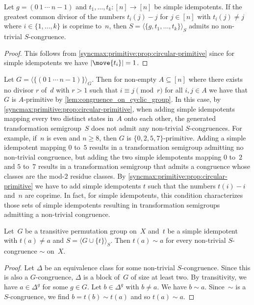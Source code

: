 \begin{corollary}
	Let $g = (0 ~ 1 ~ \cdots ~ n - 1)$
	and $t_1, \ldots, t_k \colon [n] \to [n]$
	be simple idempotents. If the greatest common divisor
	of the numbers $t_i(j) - j$ 
	for $j \in [n]$ with $t_i(j) \ne j$
	where $i \in \{1,\ldots,k\}$
	is coprime to~$n$, then $S = \langle \{g,t_1,\ldots,t_k\} \rangle_S$
	admits no non-trivial $S$-congruence.	
\end{corollary}
\begin{proof}
	This follows from \cref{syncmax:primitive:prop:circular-primitive}
	since for simple idempotents we have $|\move{t_i}| = 1$.
\end{proof}

\begin{example}
	Let $G = \langle \{ (0 ~ 1 ~ \cdots ~ n - 1) \} \rangle_G$.
	Then for non-empty $A \subseteq [n]$ where there exists
	no divisor $r$ of~$d$ with $r > 1$ such that $i \equiv j \pmod{r}$
	for all $i,j \in A$
	we have that $G$ is $A$-primitive
	by \cref{lem:congruence_on_cyclic_group}.
	In this case, by \cref{syncmax:primitive:prop:circular-primitive},
	when adding simple idempotents mapping
	every two distinct states in~$A$ onto each other,
	the generated transformation semigroup~$S$
	does not admit any non-trivial $S$-congruences.
	For example, if~$n$ is even and $n \ge 8$,
	then $G$ is $\{0,2,5,7\}$-primitive.
	Adding a simple idempotent mapping $0$ to~$5$
	results in a transformation semigroup admitting
	no non-trivial congruence,
	but adding the two simple idempotents
	mapping $0$ to~$2$ 
	and $5$ to~$7$
	results in a transformation semigroup
	that admits a congruence whose classes
	are the mod-$2$ residue classes.
	By \cref{syncmax:primitive:prop:circular-primitive} we have to add simple idempotents $t$
	such that the numbers $t(i) - i$
	and~$n$ are coprime. In fact, for simple idempotents,
	this condition characterizes those sets
	of simple idempotents
	resulting in transformation semigroups
	admitting a non-trivial congruence.	
\end{example}

\begin{lemma} \label{syncmax:primitive:lem:transitive-primitive}
	Let~$G$ be a transitive permutation group on~$X$ and~$t$ be a simple idempotent
	with $t(a) \ne a$ and $S = \langle G \cup \{t\} \rangle_S$.
	Then $t(a) \sim a$ for every non-trivial $S$-congruence $\sim$
	on~$X$.	
\end{lemma}
\begin{proof}
	Let $\Delta$ be an equivalence class for some non-trivial $S$-congruence.
	Since this is also a $G$-congruence, $\Delta$ is a block of~$G$
	of size at least two.
	By transitivity, we have $a \in \Delta^g$ for some $g \in G$.
	Let $b \in \Delta^g$ with $b \ne a$.
	We have $b \sim a$.
	Since~$\sim$ is a $S$-congruence, we find $b = t(b) \sim t(a)$
	and so $t(a) \sim a$.	
\end{proof}


